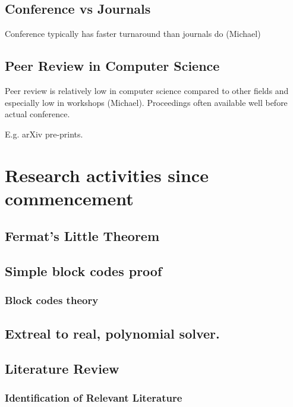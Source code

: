 \documentclass{article}
\begin{document}
\subsection{Conference vs Journals}

Conference typically has faster turnaround than journals do (Michael)

\subsection{Peer Review in Computer Science}

Peer review is relatively low in computer science compared to other fields and especially low in workshops (Michael). Proceedings often available well before actual conference.

E.g. arXiv pre-prints.

\section{Research activities since commencement}

\subsection {Fermat's Little Theorem}

\subsection {Simple block codes proof}

\subsubsection {Block codes theory}

\subsubsection{}	


\subsection {Extreal to real, polynomial solver.}

\subsection{Literature Review}

\subsubsection{Identification of Relevant Literature}
\end{document}
